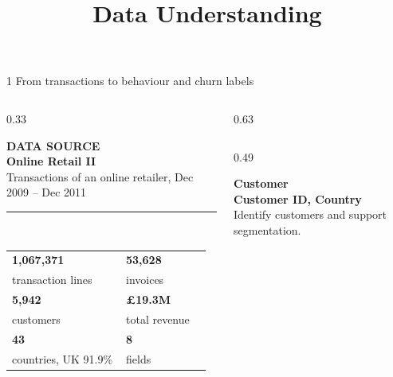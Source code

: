 \documentclass[aspectratio=169,10pt]{beamer}
\title{Data Understanding}
\author{}
\date{}
\newcommand{\dhead}[1]{{\bfseries\normalsize\color{hustred}#1}}
\begin{document}
\begin{frame}[t]{1 \textperiodcentered{} From transactions to behaviour and churn labels}
  \vspace*{-0.55cm}
  \begin{columns}[T]
    \begin{column}{0.33\textwidth}
      \begin{tcolorbox}[ddark, height=4.9cm]
        {\bfseries\tiny\color{hustgold}DATA SOURCE}\\[1pt]
        {\bfseries\large Online Retail II}\\[1pt]
        {\scriptsize\color{white!80}Transactions of an online retailer, Dec 2009 -- Dec 2011}\\[-1pt]
        {\color{hustgold}\rule{\linewidth}{0.8pt}}\\[3pt]
        \begin{tabular}{@{}p{0.56\linewidth}@{}p{0.42\linewidth}@{}}
          {\bfseries\normalsize 1,067,371} & {\bfseries\normalsize 53,628}\\[-2pt]
          {\tiny\color{white!80}transaction lines} & {\tiny\color{white!80}invoices}\\[4pt]
          {\bfseries\normalsize 5,942} & {\bfseries\normalsize \pounds19.3M}\\[-2pt]
          {\tiny\color{white!80}customers} & {\tiny\color{white!80}total revenue}\\[4pt]
          {\bfseries\normalsize 43} & {\bfseries\normalsize 8}\\[-2pt]
          {\tiny\color{white!80}countries, UK 91.9\%} & {\tiny\color{white!80}fields}
        \end{tabular}
      \end{tcolorbox}
    \end{column}
    \begin{column}{0.63\textwidth}
      \begin{columns}[T]
        \begin{column}{0.49\linewidth}
          \begin{tcolorbox}[dcard, height=1.95cm]
            \dhead{Customer}\\
            {\bfseries\scriptsize Customer ID, Country}\\
            {\tiny\color{inkgray}Identify customers and support segmentation.}
          \end{tcolorbox}

\end{column}
\end{columns}
\end{column}
\end{columns}
\end{frame}
\end{document}
